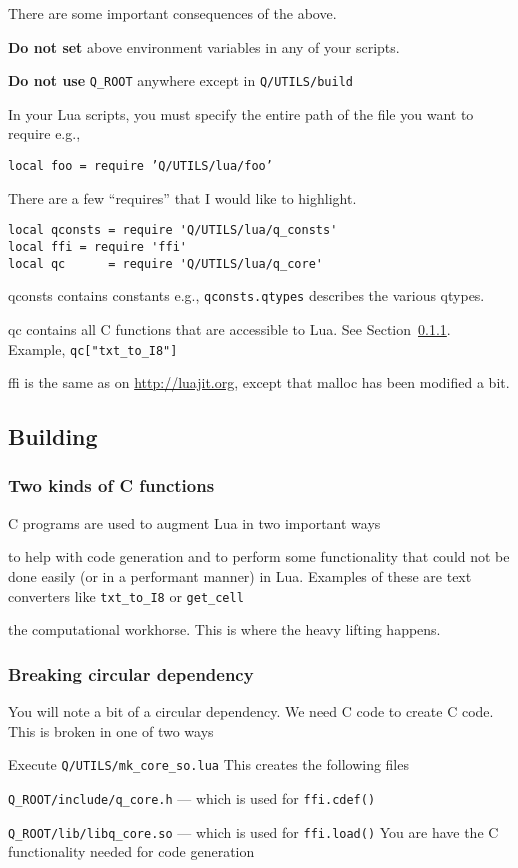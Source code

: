 There are some important consequences of the above. 
\be
\item {\bf Do  not set} above environment variables in any of your scripts.
\item {\bf Do not use} \verb+Q_ROOT+ anywhere except in \verb+Q/UTILS/build+
\item In your Lua scripts, you must specify the entire path of the file you want
to require e.g.,
\begin{center}
{\tt local foo = require 'Q/UTILS/lua/foo' }
\end{center}
\item There are a few ``requires'' that I would like to highlight.
\begin{verbatim}
local qconsts = require 'Q/UTILS/lua/q_consts'
local ffi = require 'ffi'
local qc      = require 'Q/UTILS/lua/q_core'
\end{verbatim}
\be
\item qconsts contains constants e.g., \verb+qconsts.qtypes+ describes the
various qtypes.
\item qc contains all C functions that are accessible to Lua. See  Section~\ref{two_kinds_c_functions}. Example, \verb+qc["txt_to_I8"]+
\item ffi is the same as on \url{http://luajit.org}, except that malloc has been
modified a bit.
\ee
\ee


\subsection{Building}

\subsubsection{Two kinds of C functions}
\label{two_kinds_c_functions}
C programs are used to augment Lua in two important ways
\be
\item to help with code generation and to perform some functionality that 
could not be done easily (or in a performant manner) in Lua. Examples
of these are text converters like \verb+txt_to_I8+ or \verb+get_cell+
\item the computational workhorse. This is where the heavy lifting happens.
\ee

\subsubsection{Breaking circular dependency}
You will note a bit of a circular dependency. We need C code to create
C code.  This is broken in one of two ways
\be
\item Execute \verb+Q/UTILS/mk_core_so.lua+ This creates the following 
files 
\be
\item \verb+Q_ROOT/include/q_core.h+ --- which is used for \verb+ffi.cdef()+
\item \verb+Q_ROOT/lib/libq_core.so+ --- which is used for \verb+ffi.load()+
\ee
You are have the C functionality needed for code generation

